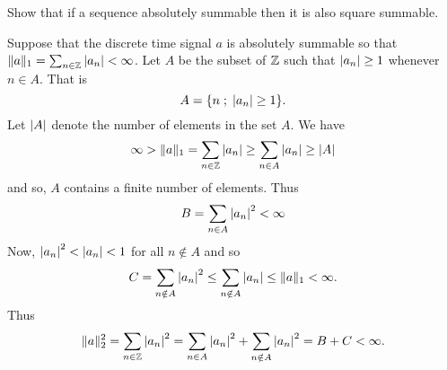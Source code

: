 \begin{excersizelist}
\item \label{excer:sumsqreexp} Show that if a sequence absolutely summable then it is also square summable.
\begin{solution}
Suppose that the discrete time signal $a$ is absolutely summable so that $\|a\|_1 = \sum_{n\in{\mathbb Z}} \left\vert a_n \right\vert < \infty$.  Let $A$ be the subset of ${\mathbb Z}$ such that $\left\vert a_n \right\vert \geq 1$ whenever $n \in A$.  That is
\[
A = \{ n \; ; \; \left\vert a_n \right\vert \geq 1 \}.
\]
Let $\left\vert A \right\vert$ denote the number of elements in the set $A$.  We have
\[
\infty > \|a\|_1 = \sum_{n\in{\mathbb Z}} \left\vert a_n \right\vert \geq \sum_{n \in A} \left\vert a_n \right\vert \geq \left\vert A \right\vert
\]
and so, $A$ contains a finite number of elements.  Thus
\[
B = \sum_{n \in A} \left\vert a_n \right\vert^2 < \infty
\]
Now, $\left\vert a_n \right\vert^2 < \left\vert a_n \right\vert< 1$ for all $n \notin A$ and so 
\[
C = \sum_{n \notin A} \left\vert a_n \right\vert^2 \leq \sum_{n \notin A} \left\vert a_n \right\vert \leq \|a\|_1 < \infty.
\]
Thus
\[
\|a\|_2^2 = \sum_{n \in {\mathbb Z}} \left\vert a_n \right\vert^2 = \sum_{n \in A} \left\vert a_n \right\vert^2 + \sum_{n \notin A} \left\vert a_n \right\vert^2 = B + C < \infty.
\]
\end{solution}


\end{excersizelist}
